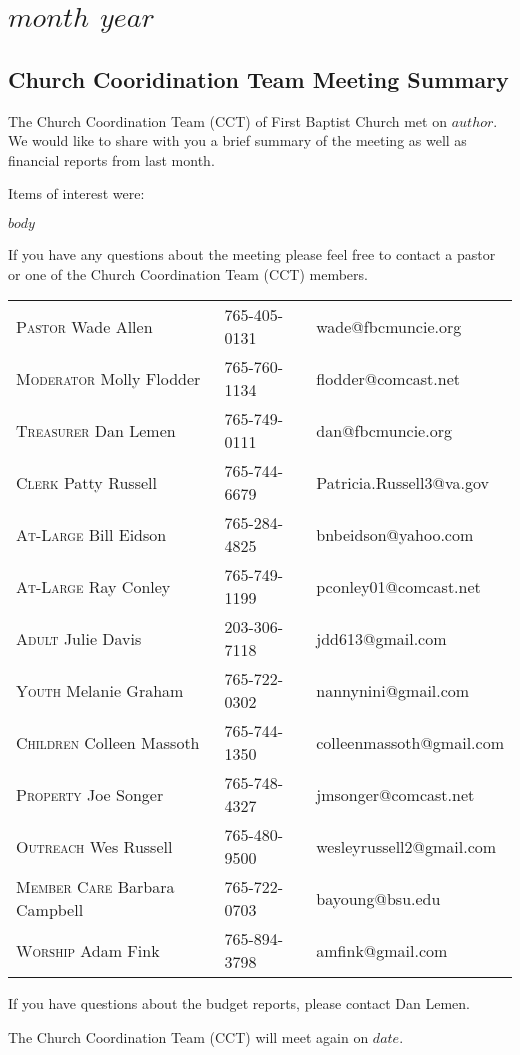\documentclass[Letter, 11pt, twoside]{report}
\begin{document}
\part{$month$ $year$}
\chapter{Church Cooridination Team Meeting Summary}

The Church Coordination Team (CCT) of First Baptist Church met on $author$. We would like to share with you a brief summary of the meeting as well as financial reports from last month.

Items of interest were:

$body$

If you have any questions about the meeting please feel free to contact a pastor or one of the Church Coordination Team (CCT) members.

\begin{tabular}{@{}lll}
\textsc{Pastor} Wade Allen & 765-405-0131 & wade@fbcmuncie.org\\
\textsc{Moderator} Molly Flodder & 765-760-1134 & flodder@comcast.net\\
\textsc{Treasurer} Dan Lemen & 765-749-0111 & dan@fbcmuncie.org\\
\textsc{Clerk} Patty Russell & 765-744-6679 & Patricia.Russell3@va.gov \\
\textsc{At-Large} Bill Eidson & 765-284-4825 & bnbeidson@yahoo.com \\
\textsc{At-Large} Ray Conley & 765-749-1199 & pconley01@comcast.net\\
\textsc{Adult} Julie Davis & 203-306-7118  & jdd613@gmail.com\\
\textsc{Youth} Melanie Graham & 765-722-0302 & nannynini@gmail.com\\
\textsc{Children} Colleen Massoth & 765-744-1350 & colleenmassoth@gmail.com\\
\textsc{Property} Joe Songer & 765-748-4327 & jmsonger@comcast.net\\
\textsc{Outreach} Wes Russell & 765-480-9500 & wesleyrussell2@gmail.com\\
\textsc{Member Care} Barbara Campbell & 765-722-0703 & bayoung@bsu.edu  \\
\textsc{Worship} Adam Fink & 765-894-3798  & amfink@gmail.com \\ 
\end{tabular}

If you have questions about the budget reports, please contact  
Dan Lemen.

The Church Coordination Team (CCT) will meet again on $date$. 




\end{document}
